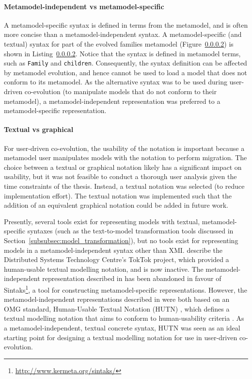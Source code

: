 \paragraph{Metamodel-independent vs metamodel-specific} A metamodel-specific syntax is defined in terms from the metamodel, and is often more concise than a metamodel-independent syntax. A metamodel-specific (and textual) syntax for part of the evolved families metamodel (Figure~\ref{}) is shown in Listing~\ref{}. Notice that the syntax is defined in metamodel terms, such as \texttt{Fa\-mi\-ly} and \texttt{ch\-il\-dr\-en}. Consequently, the syntax definition can be affected by metamodel evolution, and hence cannot be used to load a model that does not conform to its metamodel. As the alternative syntax was to be used during user-driven co-evolution (to manipulate models that do not conform to their metamodel), a metamodel-independent representation was preferred to a metamodel-specific representation. 

\paragraph{Textual vs graphical} For user-driven co-evolution, the usability of the notation is important because a metamodel user manipulates models with the notation to perform migration. The choice between a textual or graphical notation likely has a significant impact on usability, but it was not feasible to conduct a thorough user analysis given the time constraints of the thesis. Instead, a textual notation was selected (to reduce implementation effort). The textual notation was implemented such that the addition of an equivalent graphical notation could be added in future work. 

Presently, several tools exist for representing models with textual, metamodel-specific syntaxes (such as the text-to-model transformation tools discussed in Section~\ref{subsubsec:model_transformation}), but no tools exist for representing models in a metamodel-independent syntax other than XMI. \cite{steel01hutn} describe the Distributed Systems Technology Centre's TokTok project, which provided a human-usable textual modelling notation, and is now inactive. The metamodel-independent representation described in \cite{muller05hutn} has been abandoned in favour of Sintaks\footnote{\url{http://www.kermeta.org/sintaks/}}, a tool for constructing metamodel-specific representations. However, the metamodel-independent representations described in \cite{steel01hutn,muller05hutn} were both based on an OMG standard, Human-Usable Textual Notation (HUTN) \cite{hutn}, which defines a textual modelling notation that aims to conform to human-usability criteria \cite{hutn}. As a metamodel-independent, textual concrete syntax, HUTN was seen as an ideal starting point for designing a textual modelling notation for use in user-driven co-evolution.

